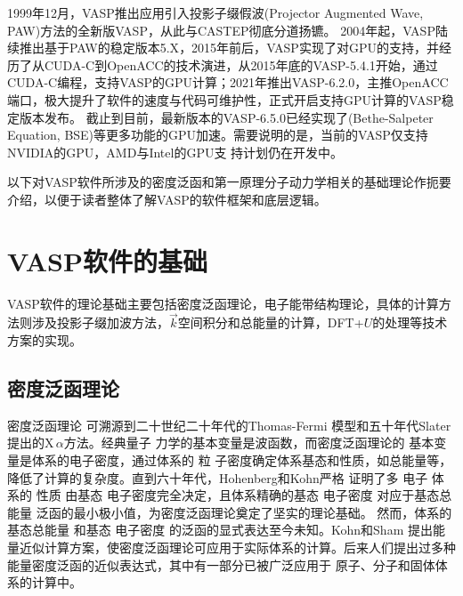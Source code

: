 1999年12月，\textrm{VASP}推出应用引入投影子缀假波\textrm{(Projector Augmented  Wave, PAW)}方法的全新版\textrm{VASP}，从此与\textrm{CASTEP}彻底分道扬镳。
2004年起，\textrm{VASP}陆续推出基于\textrm{PAW}的稳定版本\textrm{5.X}，2015年前后，\textrm{VASP}实现了对GPU的支持，并经历了从\textrm{CUDA-C}到\textrm{OpenACC}的技术演进，从2015年底的\textrm{VASP-5.4.1}开始，通过\textrm{CUDA-C}编程，支持\textrm{VASP}的\textrm{GPU}计算；2021年推出\textrm{VASP-6.2.0}，主推\textrm{OpenACC}端口，极大提升了软件的速度与代码可维护性，正式开启支持\textrm{GPU}计算的\textrm{VASP}稳定版本发布。
截止到目前，最新版本的\textrm{VASP-6.5.0}已经实现了\textrm{(Bethe-Salpeter Equation, BSE)}等更多功能的\textrm{GPU}加速。需要说明的是，当前的\textrm{VASP}仅支持\textrm{NVIDIA}的\textrm{GPU}，\textrm{AMD}与\textrm{Intel}的\textrm{GPU}支
持计划仍在开发中。

以下对\textrm{VASP}软件所涉及的密度泛函和第一原理分子动力学相关的基础理论作扼要介绍，以便于读者整体了解\textrm{VASP}的软件框架和底层逻辑。

\section{\rm{VASP}软件的基础}
\textrm{VASP}软件的理论基础主要包括密度泛函理论，电子能带结构理论，具体的计算方法则涉及投影子缀加波方法，$\vec k$空间积分和总能量的计算，\textrm{DFT}+$U$的处理等技术方案的实现。
\subsection{密度泛函{理论}} \label{chap:dft}
密度泛函理论%
可溯源到二十世纪二十年代的Thomas-Fermi%
{模型}和五十年代Slater提出的X\,$\alpha$方法。经典量子%
{力}学的基本变量是波函数，而密度泛函理论的%
{基本变量是体系的电子}密度，通过体系的%
粒%
子密度确定体系基态和性质，如总能量等，降低了计算的复杂度。直到六十年代，Hohenberg和Kohn严格%
证明了多%
{电}子%
体系的%
性质%
由基态%
{电}子密度完全决定，且体系精确的基态%
{电}子密度%
{对应于}基态总能量%
{泛函的最小极小值}，为密度泛函理论奠定了坚实的理论基础。%
然而，体系的基态总能量%
和基态%
{电}子密度%
{的泛函的显式表达}至今未知。Kohn和\linebreak Sham%
{提出能量近似计算方案，使密度泛函理论可应用于实际体系的计算。后来人们提出过多种能量密度泛函的近似表达式，其中有一部分已被}广泛应用于%
原子、分子和固体体系{的计算中}。

